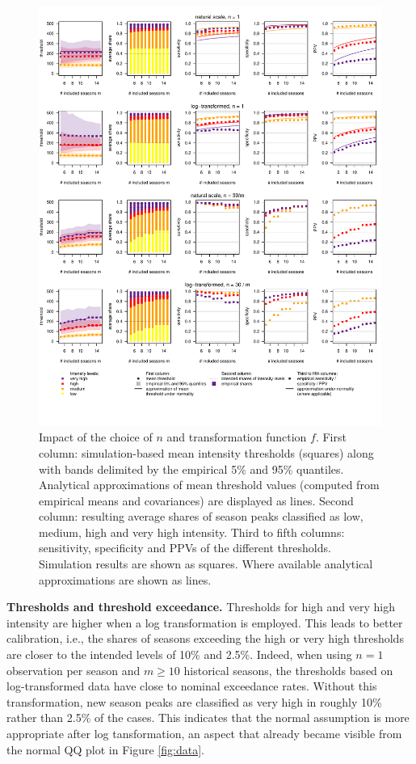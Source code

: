 \documentclass{article}
\begin{document}
\begin{figure}[h!]
\centering
\includegraphics[width=1\textwidth]{figure/plot_fr.pdf}

\vspace{-1.5cm}

\caption{Impact of the choice of $n$ and transformation function $f$. First column: simulation-based mean intensity thresholds (squares) along with bands delimited by the empirical 5\% and 95\% quantiles. Analytical approximations of mean threshold values (computed from empirical means and covariances) are displayed as lines. Second column: resulting average shares of season peaks classified as low, medium, high and very high intensity. Third to fifth columns: sensitivity, specificity and PPVs of the different thresholds. Simulation results are shown as squares. Where available analytical approximations are shown as lines.}
\label{fig:results1}
\end{figure}

\textbf{Thresholds and threshold exceedance.} Thresholds for high and very high intensity are higher when a log transformation is employed. This leads to better calibration, i.e., the shares of seasons exceeding the high or very high thresholds are closer to the intended levels of 10\% and 2.5\%. Indeed, when using $n = 1$ observation per season and $m \geq 10$ historical seasons, the thresholds based on log-transformed data have close to nominal exceedance rates. Without this transformation, new season peaks are classified as very high in roughly 10\% rather than 2.5\% of the cases. This indicates that the normal assumption is more appropriate after log tansformation, an aspect that already became visible from the normal QQ plot in Figure \ref{fig:data}.
\end{document}

